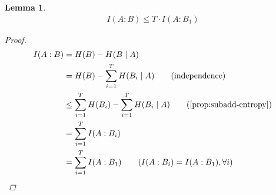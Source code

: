 \documentclass[12]{amsart}
\newcommand\0{\mathbf{0}}
\newcommand\<{\langle}
\renewcommand\>{\rangle}
\newtheorem{lemma}[theorem]{Lemma}
\begin{document}
\begin{lemma}
\begin{align*}
I(A:B) \leq T \cdot I(A:B_1)
\end{align*}

\begin{proof}
\begin{align*}
	I(A:B) &= H(B) - H(B \mid A) \\
	&= H(B) - \sum_{i=1}^T H(B_i \mid A) \tag{independence} \\
	&\leq \sum_{i=1}^T H(B_i) - \sum_{i=1}^T H(B_i \mid A) \tag{\ref{prop:subadd-entropy}} \\
	&= \sum_{i=1}^T I(A :B_i) \\
	&= \sum_{i=1}^T I(A:B_1) \tag{$I(A : B_i) = I(A : B_1), \forall i$}
\end{align*}
\end{proof}
\end{lemma}
\end{document}
